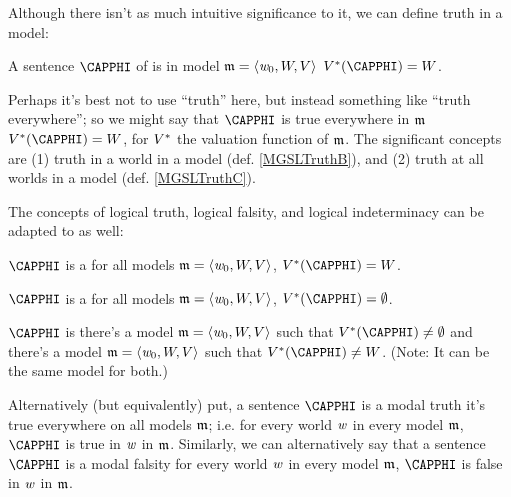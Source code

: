 \noindent{}Although there isn't as much intuitive significance to it, we can define truth in a model:
\begin{majorILnc}{}
A sentence $\CAPPHI$ of \MGSL{} is  in model $\mathfrak{m}=\langle\mathit{w}_0,W,V\rangle$ \Iff $\integer{V}^*(\CAPPHI)=\integer{W}$.
\end{majorILnc}
\noindent{}Perhaps it's best not to use ``truth'' here, but instead something like ``truth everywhere''; so we might say that $\CAPPHI$ is true everywhere in $\mathfrak{m}$ \Iff $\integer{V}^*(\CAPPHI)=\integer{W}$, for $V^*$ the valuation function of $\mathfrak{m}$.
The significant concepts are (1) truth in a world in a model (def. \ref{MGSLTruthB}), and (2) truth at all worlds in a model (def. \ref{MGSLTruthC}).

The concepts of logical truth, logical falsity, and logical indeterminacy can be adapted to \MGSL{} as well:
\begin{majorILnc}{}
$\CAPPHI$ is a  \Iff for all models $\mathfrak{m}=\langle\mathit{w}_0,W,V\rangle$, $\integer{V}^*(\CAPPHI)=\integer{W}$.
\end{majorILnc}
\begin{majorILnc}{}
$\CAPPHI$ is a  \Iff for all models $\mathfrak{m}=\langle\mathit{w}_0,W,V\rangle$, $\integer{V}^*(\CAPPHI)=\emptyset$.
\end{majorILnc}
\begin{majorILnc}{}
$\CAPPHI$ is  \Iff there's a model $\mathfrak{m}=\langle\mathit{w}_0,W,V\rangle$ such that $\integer{V}^*(\CAPPHI)\neq\emptyset$ and there's a model $\mathfrak{m}=\langle\mathit{w}_0,W,V\rangle$ such that $\integer{V}^*(\CAPPHI)\neq\integer{W}$.  (Note: It can be the same model for both.)
\end{majorILnc}
\noindent{}Alternatively (but equivalently) put, a sentence $\CAPPHI$ is a modal truth \Iff it's true everywhere on all models $\mathfrak{m}$; i.e. \Iff for every world $\mathit{w}$ in every model $\mathfrak{m}$, $\CAPPHI$ is true in $\mathit{w}$ in $\mathfrak{m}$. 
Similarly, we can alternatively say that a sentence $\CAPPHI$ is a modal falsity \Iff for every world $\mathit{w}$ in every model $\mathfrak{m}$, $\CAPPHI$ is false in $\mathit{w}$ in $\mathfrak{m}$.

